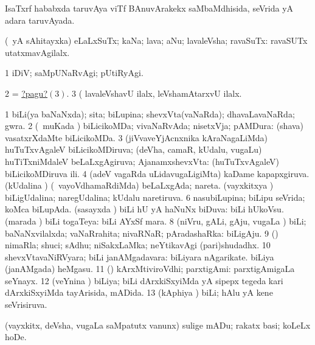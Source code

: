 \bentry
{} 
\gl{\gu}
\expl{}
\bmng
IsaTxrf hababxda taruvAya viTf BAnuvArakekx saMbaMdhisida, seVrida yA adara taruvAyada. 
\emng
\eentry

\bentry
{} 
\gl{\nA}
\expl{}
\bmng
 (\pArxparx\ yA sAhitayxka) eLaLxSuTx; kaNa; lava; aNu; lavaleVsha; ravaSuTx:  ravaSUTx utatxmavAgilalx. 
\emng

\noindent 
\gl{\pagu}
\expl{}
\bmng
\bnum
\num{1}  iDiV; saMpUNaRvAgi; pUtiRyAgi. 
\num{2}  = \hyperlink{whit2 pagu3}{?pagu?\((3)\)}. 
\hypertarget{whit2 pagu3}{} 
\num{3}  (  lavaleVshavU ilalx, leVshamAtarxvU ilalx. 
\enum
\emng
\eentry

\bentry
{} 
\gl{\gu}
\expl{}
\bmng
\bnum
\num{1} biLi(ya baNaNxda); sita; biLupina; shevxVta(vaNaRda); dhavaLavaNaRda; gwra. 
\num{2} (\kanmu\ muKada \vi) biLicikoMDa; vivaNaRvAda; nisetxVja; pAMDura:  (shava) vasatxrXdaMte biLicikoMDa. 
\num{3} (jiVvaveYjAcnxnika kAraNagaLiMda) huTuTxvAgaleV biLicikoMDiruva; (deVha, camaR, kUdalu, \mo vugaLu) huTiTxniMdaleV beLaLxgAgiruva; AjanamxshevxVta:  (huTuTxvAgaleV) biLicikoMDiruva ili. 
\num{4} (adeV vagaRda uLidavugaLigiMta) kaDame kapapxgiruva. 
\banum
{} (kUdalina \vi) (\kanmu\ vayoVdhamaRdiMda) beLaLxgAda; nareta. 
 (vayxkitxya \vi) biLigUdalina; naregUdalina; kUdalu naretiruva. 
\eanum
\numie
\num{6} nasubiLupina; biLipu seVrida; koMca biLupAda. 
\banum
{} (sasayxda \vi) biLi hU yA haNuNx biDuva:  biLi hUkoVsu. 
 (marada \vi) biLi togaTeya:  biLi AYxSf mara. 
\eanum
\numie
\num{8} (niVru, gALi, gAju, \mo vugaLa \vi) biLi; baNaNxvilalxda; vaNaRrahita; nivaRNaR; pAradashaRka:  biLigAju. 
\num{9} (\AmA) nimaRla; shuci; sAdhu; niSakxLaMka; neYtikavAgi (pari)shudadhx. 
\num{10}  shevxVtavaNiRVyara; biLi janAMgadavara:  biLiyara nAgarikate.  biLiya (janAMgada) heMgasu. 
\num{11}  (\ca) kArxMtiviroVdhi; parxtigAmi:  parxtigAmigaLa seYnayx. 
\num{12} (veYnina \vi) biLiya; biLi dArxkiSxyiMda yA sipepx tegeda kari dArxkiSxyiMda tayArisida, mADida. 
\num{13} (kAphiya \vi) biLi; hAlu yA kene seVrisiruva. 
\enum
\emng

\noindent 
\gl{\pagu}
\expl{}
\bmng
{} (vayxkitx, deVsha, \mo vugaLa saMpatutx \mo vanunx) sulige mADu; rakatx basi; koLeLx hoDe. 
\emng
\eentry

